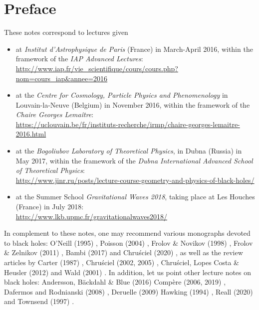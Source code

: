 \chapter*{Preface}

These notes correspond to lectures given
\begin{itemize}
\item at \emph{Institut d'Astrophysique de Paris} (France) in March-April 2016, within the
framework of the \emph{IAP Advanced Lectures}:\\
{\small\url{http://www.iap.fr/vie_scientifique/cours/cours.php?nom=cours_iap&annee=2016}}
\item at the \emph{Centre for Cosmology, Particle Physics and Phenomenology} in Louvain-la-Neuve
(Belgium) in November 2016, within the framework of the \emph{Chaire Georges Lemaître}:\\
{\small \url{https://uclouvain.be/fr/instituts-recherche/irmp/chaire-georges-lemaitre-2016.html}}
\item at the
\emph{Bogoliubov Laboratory of Theoretical Physics}, in Dubna (Russia) in May 2017,
within the framework of the \emph{Dubna International Advanced School of Theoretical Physics}:\\
{\small\url{http://www.jinr.ru/posts/lecture-course-geometry-and-physics-of-black-holes/}}
\item at the Summer School \emph{Gravitational Waves 2018}, taking place at Les Houches
(France) in July 2018:\\
{\small\url{http://www.lkb.upmc.fr/gravitationalwaves2018/}}
\end{itemize}

\vspace{2ex}

In complement to these notes, one may recommend various monographs
devoted to black holes:  O'Neill (1995) \cite{ONeil95}, Poisson (2004) \cite{Poiss04}, Frolov \& Novikov (1998) \cite{FroloN98},
Frolov \& Zelnikov (2011) \cite{FroloZ11}, Bambi (2017) \cite{Bambi17} and Chru\'sciel (2020) \cite{Chrus20}, as well as the review
articles by Carter (1987) \cite{Carte87}, Chru\'sciel (2002, 2005) \cite{Chrus02, Chrus05},
Chru\'sciel, Lopes Costa \& Heusler (2012) \cite{ChrusLH12} and Wald (2001) \cite{Wald01}.
In addition, let us point other lecture notes on black holes:
Andersson, Bäckdahl \& Blue (2016) \cite{AnderBB16}
Compère (2006, 2019) \cite{Compe06,Compe19},
Dafermos and Rodnianski (2008) \cite{DaferR13},  Deruelle (2009) \cite{Derue09}
Hawking (1994) \cite{Hawki94,HawkiP15}, Reall (2020) \cite{Reall20} and Townsend (1997) \cite{Towns97}.

